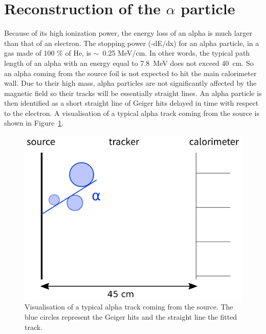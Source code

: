 \documentclass[main.tex]{subfiles}
\begin{document}


\section{Reconstruction of the $\alpha$ particle}\label{sec:ReconstructionAlphaParticle}


Because of its high ionization power, the energy loss of an alpha is much larger than that of an electron. The stopping power (-dE/dx) for an alpha particle, in a gas made of 100 \% of He, is $\sim$~0.25 MeV/cm. In other words, the typical path length of an alpha with an energy equal to 7.8~MeV does not exceed 40~cm. So an alpha coming from the source foil is not expected to hit the main calorimeter wall. Due to their high mass, alpha particles are not significantly affected by the magnetic field so their tracks will be essentially straight lines. An alpha particle is then identified as a short straight line of Geiger hits delayed in time with respect to the electron. A visualisation of a typical alpha track coming from the source is shown in Figure~\ref{visu_alpha_typical_track}.


\begin{figure}[h!]
\begin{center}
\includegraphics[scale=0.50]{pictures/Chap5/alpha_comic.pdf}
\caption{Visualisation of a typical alpha track coming from the source. The blue circles represent the Geiger hits and the straight line the fitted track.}
\label{visu_alpha_typical_track}
\end{center}
\end{figure}
\end{document}
